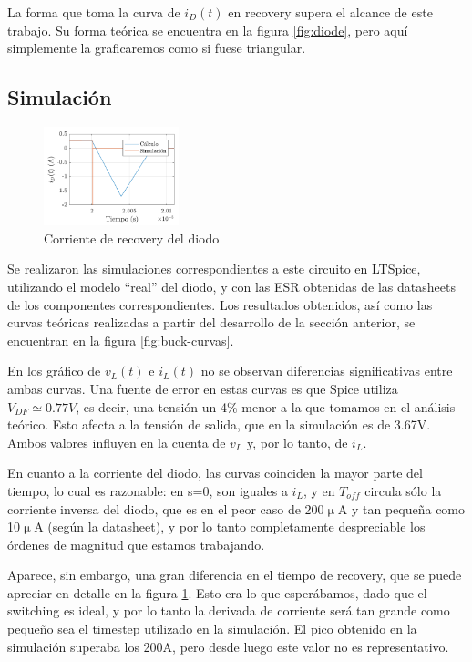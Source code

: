 \documentclass[e4_tp1_main.tex]{subfiles}
\begin{document}
La forma que toma la curva de $i_D(t)$ en recovery supera el alcance de este trabajo. Su forma te\'orica se encuentra en la figura \ref{fig:diode}, pero aqu\'i simplemente la graficaremos como si fuese triangular. 



\subsection{Simulaci\'on}

\begin{figure}
	\centering
	\includegraphics[width=0.35\textwidth]{images/ej2/id-recovery.pdf}
	\caption{Corriente de recovery del diodo}
	\label{fig:id-recovery}
\end{figure}

Se realizaron las simulaciones correspondientes a este circuito en LTSpice, utilizando el modelo ``real'' del diodo, y con las ESR obtenidas de las datasheets de los componentes correspondientes. Los resultados obtenidos, as\'i como las curvas te\'oricas realizadas a partir del desarrollo de la secci\'on anterior, se encuentran en la figura \ref{fig:buck-curvas}.

En los gr\'afico de $v_L(t)$ e $i_L(t)$ no se observan diferencias significativas entre ambas curvas. Una fuente de error en estas curvas es que Spice utiliza $V_{DF} \simeq 0.77V$, es decir, una tensi\'on un 4\% menor a la que tomamos en el an\'alisis te\'orico. Esto afecta a la tensi\'on de salida, que en la simulaci\'on es de 3.67V. Ambos valores influyen en la cuenta de $v_L$ y, por lo tanto, de $i_L$.



En cuanto a la corriente del diodo, las curvas coinciden la mayor parte del tiempo, lo cual es razonable: en s=0, son iguales a $i_L$, y en $T_{off}$  circula s\'olo la corriente inversa del diodo, que es en el peor caso de 200$\upmu$A y tan peque\~na como 10$\upmu$A (seg\'un la datasheet), y por lo tanto completamente despreciable los \'ordenes de magnitud que estamos trabajando.


Aparece, sin embargo, una gran diferencia en el tiempo de recovery, que se puede apreciar en detalle en la figura \ref{fig:id-recovery}. Esto era lo que esper\'abamos, dado que el switching es ideal, y por lo tanto la derivada de corriente ser\'a tan grande como peque\~no sea el timestep utilizado en la simulaci\'on. El pico obtenido en la simulaci\'on superaba los 200A, pero desde luego este valor no es representativo. 
\end{document}

